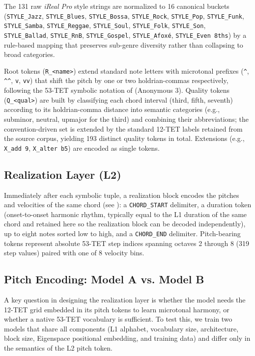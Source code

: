 \documentclass{aimc2026}
\begin{document}
The 131 raw \textit{iReal Pro} style strings are normalized to 16 canonical buckets (\texttt{STYLE\_Jazz}, \texttt{STYLE\_Blues}, \texttt{STYLE\_Bossa}, \texttt{STYLE\_Rock}, \texttt{STYLE\_Pop}, \texttt{STYLE\_Funk}, \texttt{STYLE\_Samba}, \texttt{STYLE\_Reggae}, \texttt{STYLE\_Soul}, \texttt{STYLE\_Folk}, \texttt{STYLE\_Son}, \texttt{STYLE\_Ballad}, \texttt{STYLE\_RnB}, \texttt{STYLE\_Gospel}, \texttt{STYLE\_Afox\'e}, \texttt{STYLE\_Even\,8ths}) by a rule-based mapping that preserves sub-genre diversity rather than collapsing to broad categories.

Root tokens (\texttt{R\_<name>}) extend standard note letters with microtonal prefixes (\texttt{\^{}}, \texttt{\^{}\^{}}, \texttt{v}, \texttt{vv}) that shift the pitch by one or two holdrian-commas respectively, following the 53-TET symbolic notation of (Anonymous 3). Quality tokens (\texttt{Q\_<qual>}) are built by classifying each chord interval (third, fifth, seventh) according to its holdrian-comma distance into semantic categories (e.g., subminor, neutral, upmajor for the third) and combining their abbreviations; the convention-driven set is extended by the standard 12-TET labels retained from the source corpus, yielding 193 distinct quality tokens in total. Extensions (e.g., \texttt{X\_add\,9}, \texttt{X\_alter\,b5}) are encoded as single tokens.

\subsection{Realization Layer (L2)}
\label{sec:l2}

Immediately after each symbolic tuple, a realization block encodes the pitches and velocities of the same chord (see ): a \texttt{CHORD\_START} delimiter, a duration token (onset-to-onset harmonic rhythm, typically equal to the L1 duration of the same chord and retained here so the realization block can be decoded independently), up to eight notes sorted low to high, and a \texttt{CHORD\_END} delimiter. Pitch-bearing tokens represent absolute 53-TET step indices spanning octaves 2 through 8 (319 step values) paired with one of 8 velocity bins.

\subsection{Pitch Encoding: Model A vs. Model B}
\label{sec:model_ab}

A key question in designing the realization layer is whether the model needs the 12-TET grid embedded in its pitch tokens to learn microtonal harmony, or whether a native 53-TET vocabulary is sufficient. To test this, we train two models that share all components (L1 alphabet, vocabulary size, architecture, block size, Eigenspace positional embedding, and training data) and differ only in the semantics of the L2 pitch token.
\end{document}
